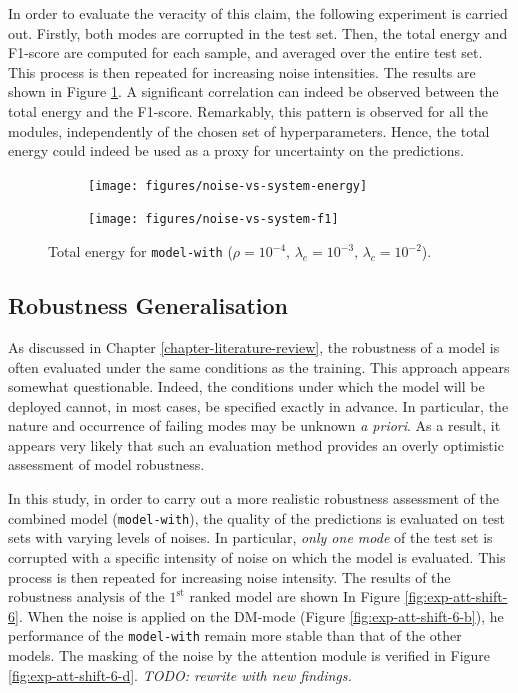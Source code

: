 In order to evaluate the veracity of this claim, the following experiment is carried out. Firstly, both modes are corrupted in the test set. Then, the total energy and F1-score are computed for each sample, and averaged over the entire test set. This process is then repeated for increasing noise intensities. The results are shown in Figure \ref{fig:exp-att-shift-5}. A significant correlation can indeed be observed between the total energy and the F1-score. Remarkably, this pattern is observed for all the modules, independently of the chosen set of hyperparameters. Hence, the total energy could indeed be used as a proxy for uncertainty on the predictions. 
\begin{figure}[H]
\centering
\begin{subfigure}{.5\textwidth}
  \centering
  \texttt{[image: figures/noise-vs-system-energy]}
\end{subfigure}%
\begin{subfigure}{.5\textwidth}
  \centering
  \texttt{[image: figures/noise-vs-system-f1]}
\end{subfigure}
\caption[Total energy]{Total energy for \texttt{model-with} ($\rho=10^{-4},\,\lambda_e=10^{-3},\,\lambda_c=10^{-2}$).}
\label{fig:exp-att-shift-5}
\end{figure}

\subsection*{Robustness Generalisation}\label{sec:generalization}
As discussed in Chapter \ref{chapter-literature-review}, the robustness of a model is often evaluated under the same conditions as the training. This approach appears somewhat questionable. Indeed, the conditions under which the model will be deployed cannot, in most cases,  be specified exactly in advance. In particular, the nature and occurrence of failing modes may be unknown \textit{a priori}. As a result, it appears very likely that such an evaluation method provides an overly optimistic assessment of model robustness.

In this study, in order to carry out a more realistic robustness assessment of the combined model (\texttt{model-with}), the quality of the predictions is evaluated on test sets with varying levels of noises. In particular, \textit{only one mode} of the test set is corrupted with a specific intensity of noise on which the model is evaluated. This process is then repeated for increasing noise intensity. The results of the robustness analysis of the $1^\text{st}$ ranked model are shown In Figure \ref{fig:exp-att-shift-6}. When the noise is applied on the DM-mode (Figure \ref{fig:exp-att-shift-6-b}), he performance of the \texttt{model-with} remain more stable than that of the other models. The masking of the noise by the attention module is verified in Figure \ref{fig:exp-att-shift-6-d}. \textit{TODO: rewrite with new findings.}


